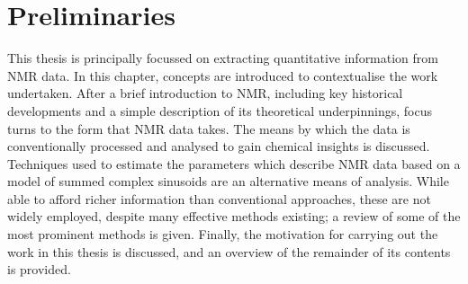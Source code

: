 \chapter{Preliminaries}
\label{chap:intro}

This thesis is principally focussed on extracting quantitative information
from \ac{NMR} data. In this chapter, concepts are introduced to
contextualise the work undertaken.
After a brief introduction to \ac{NMR}, including key historical developments
and a simple description of its theoretical underpinnings, focus turns to
the form that \ac{NMR} data takes. The means by which the data is
conventionally processed and analysed to gain chemical insights is discussed.
Techniques used to estimate the parameters which describe \ac{NMR} data based
on a model of summed complex sinusoids are an alternative means of analysis.
While able to afford richer information than conventional
approaches, these are not widely employed, despite many effective
methods existing; a review of some of the most prominent methods is
given. Finally, the motivation for carrying out the work in this thesis is
discussed, and an overview of the remainder of its contents is provided.




